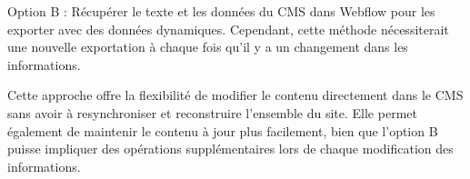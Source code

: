 Option B : Récupérer le texte et les données du CMS dans Webflow pour les exporter avec des données dynamiques. Cependant, cette méthode nécessiterait une nouvelle exportation à chaque fois qu'il y a un changement dans les informations.

Cette approche offre la flexibilité de modifier le contenu directement dans le CMS sans avoir à resynchroniser et reconstruire l'ensemble du site. Elle permet également de maintenir le contenu à jour plus facilement, bien que l'option B puisse impliquer des opérations supplémentaires lors de chaque modification des informations.